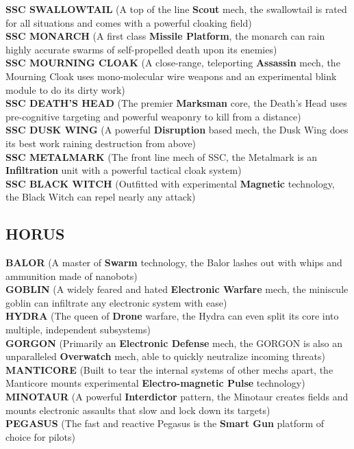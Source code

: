 \textbf{SSC SWALLOWTAIL} (A top of the line \textbf{Scout} mech, the swallowtail is rated for all situations and comes with a powerful cloaking field)\\
\textbf{SSC MONARCH} (A first class \textbf{Missile Platform}, the monarch can rain highly accurate swarms of self-propelled death upon its enemies)\\
\textbf{SSC MOURNING CLOAK} (A close-range, teleporting \textbf{Assassin} mech, the Mourning Cloak uses mono-molecular wire weapons and an experimental blink module to do its dirty work)\\
\textbf{SSC DEATH’S HEAD} (The premier \textbf{Marksman} core, the Death’s Head uses pre-cognitive targeting and powerful weaponry to kill from a distance)\\
\textbf{SSC DUSK WING} (A powerful \textbf{Disruption} based mech, the Dusk Wing does its best work raining destruction from above)\\
\textbf{SSC METALMARK} (The front line mech of SSC, the Metalmark is an \textbf{Infiltration} unit with a powerful tactical cloak system)\\
\textbf{SSC BLACK WITCH} (Outfitted with experimental \textbf{Magnetic} technology, the Black Witch can repel nearly any attack)

\subsection*{HORUS}

\textbf{BALOR} (A master of \textbf{Swarm} technology, the Balor lashes out with whips and ammunition made of nanobots)\\
\textbf{GOBLIN} (A widely feared and hated \textbf{Electronic Warfare} mech, the miniscule goblin can infiltrate any electronic system with ease)\\
\textbf{HYDRA} (The queen of \textbf{Drone} warfare, the Hydra can even split its core into multiple, independent subsystems)\\
\textbf{GORGON} (Primarily an \textbf{Electronic Defense} mech, the GORGON is also an unparalleled \textbf{Overwatch} mech, able to quickly neutralize incoming threats)\\
\textbf{MANTICORE} (Built to tear the internal systems of other mechs apart, the Manticore mounts experimental \textbf{Electro-magnetic Pulse} technology)\\
\textbf{MINOTAUR} (A powerful \textbf{Interdictor} pattern, the Minotaur creates fields and mounts electronic assaults that slow and lock down its targets)\\
\textbf{PEGASUS} (The fast and reactive Pegasus is the \textbf{Smart Gun} platform of choice for pilots)

